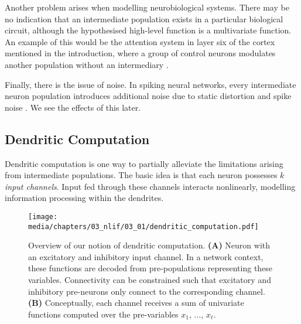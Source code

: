 Another problem arises when modelling neurobiological systems.
There may be no indication that an intermediate population exists in a particular biological circuit, although the hypothesised high-level function is a multivariate function.
An example of this would be the attention system in layer six of the cortex mentioned in the introduction, where a group of control neurons modulates another population without an intermediary \citep{bobier2014unifying}.

Finally, there is the issue of noise.
In spiking neural networks, every intermediate neuron population introduces additional noise due to static distortion and spike noise \citep[Section~2.2.2]{eliasmith2003neural}.
We see the effects of this later.

\subsection{Dendritic Computation}
\label{sec:dendritic_computation_theory_dendritic}

Dendritic computation is one way to partially alleviate the limitations arising from intermediate populations.
The basic idea is that each neuron possesses $k$ \emph{input channels}.
Input fed through these channels interacts nonlinearly, modelling information processing within the dendrites.

\begin{figure}
	\texttt{[image: media/chapters/03\_nlif/03\_01/dendritic\_computation.pdf]}%
	{\label{fig:dendritic_computation_net}}%
	{\label{fig:dendritic_computation_fun}}%
	\caption[Overview of our notion of dendritic computation.]{Overview of our notion of dendritic computation. \textbf{(A)} Neuron with an excitatory and inhibitory input channel. In a network context, these functions are decoded from pre-populations representing these variables. Connectivity can be constrained such that excitatory and inhibitory pre-neurons only connect to the corresponding channel. \textbf{(B)} Conceptually, each channel receives a sum of univariate functions computed over the pre-variables $x_1$, $\ldots$, $x_\ell$.}
\end{figure}

